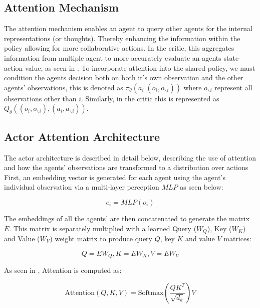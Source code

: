 \documentclass[conference]{IEEEtran}
\begin{document}

\subsection{Attention Mechanism}
The attention mechanism enables an agent to query other agents for the internal representations (or thoughts). 
Thereby enhancing the information within the policy allowing for more collaborative actions.
In the critic, this aggregates information from multiple agent to more accurately evaluate an agents state-action value, as seen in \cite{MAAC}.
To incorporate attention into the shared policy, we must condition the agents decision both on both it's own observation and the other agents' observations, this is denoted as $\pi_\theta (a_i|(o_i, o_{\backslash i}))$ where $o_{\backslash i}$ represent all observations other than $i$.
Similarly, in the critic this is represented as $Q_{\theta}((o_{i}, o_{\backslash i}), (a_{i}, a_{\backslash i}))$.


\subsection{Actor Attention Architecture}
The actor architecture is described in detail below, describing the use of attention and how the agents' observations are transformed to a distribution over actions
First, an embedding vector is generated for each agent using the agent's individual observation via a multi-layer perception $MLP$ as seen below:

\begin{equation}
    e_i = MLP(o_i)
\end{equation}

The embeddings of all the agents' are then concatenated to generate the matrix $E$.
This matrix is separately multiplied with a learned Query ($W_Q$), Key ($W_K$) and Value ($W_V$) weight matrix to produce query $Q$, key $K$ and value $V$ matrices:

\begin{equation}
{Q = EW_Q} , {K = EW_K}, {V = EW_V} 
\end{equation}

As seen in \cite{attentionneed}, Attention is computed as:

\begin{equation}
\text{Attention}(Q, K, V) = \text{Softmax}\left(\frac{QK^T}{\sqrt{d_k}}\right)V
\end{equation}
\end{document}
